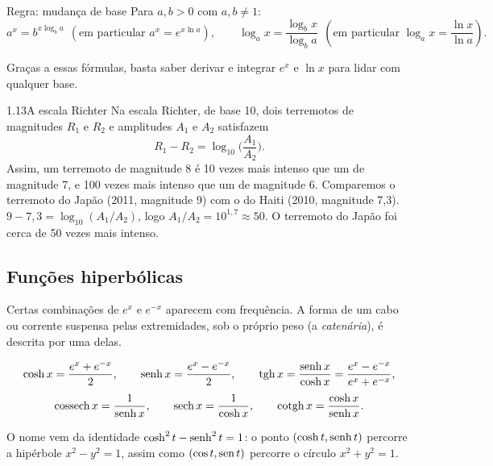 \begin{regra}{Regra: mudança de base}
Para $a,b>0$ com $a,b\neq1$:
\[
a^x=b^{x\log_b a}\ \ (\text{em particular } a^x=e^{x\ln a}),\qquad
\log_a x=\frac{\log_b x}{\log_b a}\ \ (\text{em particular } \log_a x=\frac{\ln x}{\ln a}).
\]
\end{regra}

Graças a essas fórmulas, basta saber derivar e integrar $e^x$ e $\ln x$ para lidar com
qualquer base.

\begin{exemplo}{1.13}{A escala Richter}
Na escala Richter, de base 10, dois terremotos de magnitudes $R_1$ e $R_2$ e amplitudes
$A_1$ e $A_2$ satisfazem
\[
R_1-R_2=\log_{10}\Big(\frac{A_1}{A_2}\Big).
\]
Assim, um terremoto de magnitude 8 é 10 vezes mais intenso que um de magnitude 7, e
100 vezes mais intenso que um de magnitude 6. Comparemos o terremoto do Japão (2011,
magnitude 9) com o do Haiti (2010, magnitude 7,3).
\solucao
$9-7{,}3=\log_{10}(A_1/A_2)$, logo $A_1/A_2=10^{1{,}7}\approx50$. O terremoto do Japão
foi cerca de 50 vezes mais intenso.
\end{exemplo}

\subsection{Funções hiperbólicas}

Certas combinações de $e^x$ e $e^{-x}$ aparecem com frequência. A forma de um cabo ou
corrente suspensa pelas extremidades, sob o próprio peso (a \emph{catenária}), é descrita
por uma delas.

\begin{definicao}
\[
\cosh x=\frac{e^x+e^{-x}}2,\qquad \operatorname{senh} x=\frac{e^x-e^{-x}}2,\qquad
\operatorname{tgh} x=\frac{\operatorname{senh} x}{\cosh x}=\frac{e^x-e^{-x}}{e^x+e^{-x}},
\]
\[
\operatorname{cossech} x=\frac1{\operatorname{senh} x},\qquad \operatorname{sech} x=\frac1{\cosh x},\qquad \operatorname{cotgh} x=\frac{\cosh x}{\operatorname{senh} x}.
\]
\end{definicao}

O nome vem da identidade $\cosh^2t-\operatorname{senh}^2t=1$: o ponto $(\cosh t,\operatorname{senh} t)$ percorre a
hipérbole $x^2-y^2=1$, assim como $(\cos t,\operatorname{sen} t)$ percorre o círculo $x^2+y^2=1$.


